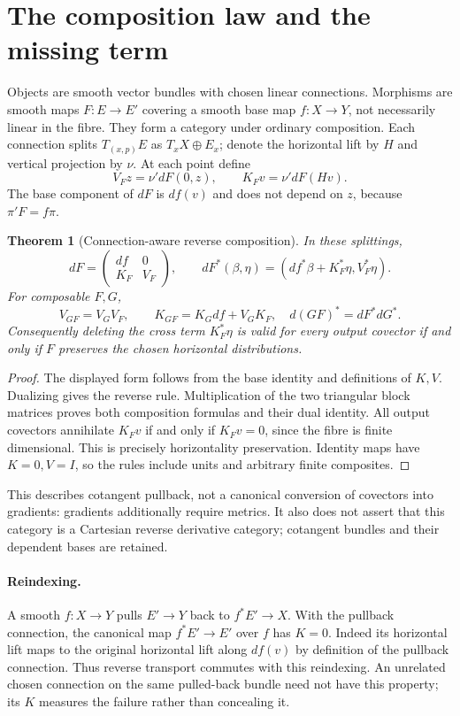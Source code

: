 \documentclass[11pt]{article}
\newtheorem{theorem}{Theorem}\newtheorem{proposition}{Proposition}
\begin{document}
\section{The composition law and the missing term}
Objects are smooth vector bundles with chosen linear connections. Morphisms are smooth maps $F:E\to E'$ covering a smooth base map $f:X\to Y$, not necessarily linear in the fibre. They form a category under ordinary composition. Each connection splits $T_{(x,p)}E$ as $T_xX\oplus E_x$; denote the horizontal lift by $H$ and vertical projection by $\nu$. At each point define
\[
 V_Fz=\nu' dF(0,z),\qquad K_Fv=\nu'dF(Hv).
\]
The base component of $dF$ is $df(v)$ and does not depend on $z$, because $\pi'F=f\pi$.
\begin{theorem}[Connection-aware reverse composition]
In these splittings,
\[
 dF=\begin{pmatrix}df&0\\K_F&V_F\end{pmatrix},\qquad
 dF^*(\beta,\eta)=(df^*\beta+K_F^*\eta,V_F^*\eta).
\]
For composable $F,G$,
\[
 V_{GF}=V_GV_F,\qquad K_{GF}=K_Gdf+V_GK_F,
\quad d(GF)^*=dF^*dG^*.
\]
Consequently deleting the cross term $K_F^*\eta$ is valid for every output covector if and only if $F$ preserves the chosen horizontal distributions.
\end{theorem}
\begin{proof}
The displayed form follows from the base identity and definitions of $K,V$. Dualizing gives the reverse rule. Multiplication of the two triangular block matrices proves both composition formulas and their dual identity. All output covectors annihilate $K_Fv$ if and only if $K_Fv=0$, since the fibre is finite dimensional. This is precisely horizontality preservation. Identity maps have $K=0,V=I$, so the rules include units and arbitrary finite composites.
\end{proof}
This describes cotangent pullback, not a canonical conversion of covectors into gradients: gradients additionally require metrics. It also does not assert that this category is a Cartesian reverse derivative category; cotangent bundles and their dependent bases are retained.

\paragraph{Reindexing.}
A smooth $f:X\to Y$ pulls $E'\to Y$ back to $f^*E'\to X$. With the pullback connection, the canonical map $f^*E'\to E'$ over $f$ has $K=0$. Indeed its horizontal lift maps to the original horizontal lift along $df(v)$ by definition of the pullback connection. Thus reverse transport commutes with this reindexing. An unrelated chosen connection on the same pulled-back bundle need not have this property; its $K$ measures the failure rather than concealing it.
\end{document}
